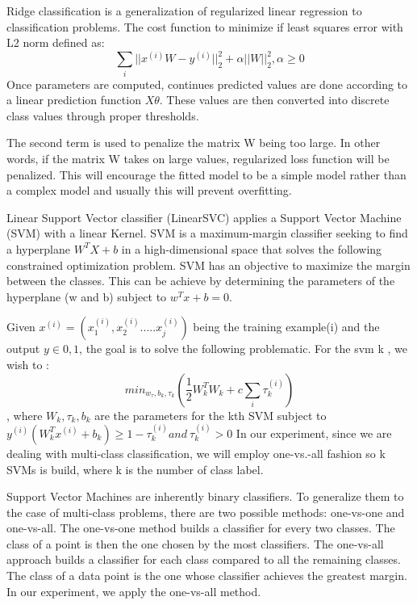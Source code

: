 Ridge classification is a generalization of regularized linear regression to classification problems.
The cost function to minimize if least squares error with L2 norm defined as:
\begin{equation}
\sum_i ||x^{(i)}W-y^{(i)}||_2^2 + \alpha ||W||_2^2, \alpha\geq 0
\label{eq:ridge-cost}
\end{equation}
Once parameters are computed, continues predicted values are done according to a linear prediction function $X\theta$. These values are then converted into discrete class values through proper thresholds.


The second term is used to penalize the matrix W being too large. In other words, if the matrix W takes on large values, regularized loss function will be penalized. This will encourage the fitted model to be a simple model rather than a complex model and usually this will prevent overfitting.

Linear Support Vector classifier (LinearSVC) applies a Support Vector Machine (SVM) with a linear Kernel. SVM is a maximum-margin classifier seeking to find a hyperplane $W^T X + b$ in a high-dimensional space that solves the following constrained optimization problem.
SVM has an objective to maximize the margin between the classes. This can be achieve by determining the parameters of the hyperplane (w and b) subject to $w^T x + b = 0$.


Given $x^{(i)}=(x_1^{(i)},x_2^{(i)}.....x_j^{(i)})$ being the training example(i) and the output $y \in {0,1}$, the goal is to solve the following problematic. For the svm k , we wish to :
$$min_{w_\tau,b_k,\tau_k}(\frac{1}{2}W_k^TW_k +c\sum_i \tau_k^{(i)})$$, where $W_k,\tau_k,b_k$ are the parameters for the kth SVM subject to $y^{(i)}(W^T_kx^{(i)}+b_k)\geq 1-\tau_k^{(i)} and \: \tau_k^{(i)}>0$
In our experiment, since we are dealing with multi-class classification, we will employ one-vs.-all fashion so k SVMs is build, where k is the number of class label.

Support Vector Machines are inherently binary classifiers. To generalize them to the case of multi-class problems, there are two possible methods: one-vs-one and one-vs-all. The one-vs-one method builds a classifier for every two classes. The class of a point is then the one chosen by the most classifiers. The one-vs-all approach builds a classifier for each class compared to all the remaining classes. The class of a data point is the one whose classifier achieves the greatest margin. In our experiment, we apply the one-vs-all method.